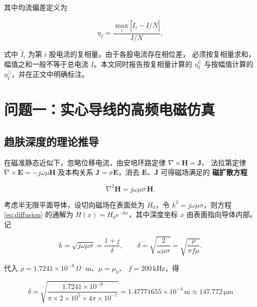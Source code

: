 \documentclass[12pt, a4paper]{ctexart}
\newcommand{\U}[1]{\ensuremath{\,\mathrm{#1}}}
\newcommand{\Uohmm}{\ensuremath{\,\Omega\cdot\mathrm{m}}}%
\begin{document}
其中均流偏差定义为

\begin{equation}
\eta_I = \frac{\max_i |\tilde I_i - I/N|}{I/N},
\label{eq:eta}
\end{equation}

式中 $\tilde I_i$ 为第 $i$ 股电流的复相量。由于各股电流存在相位差，
必须按复相量求和，幅值之和一般不等于总电流 $I$。本文同时报告按复相量计算的
$\eta_I^{\mathbb{C}}$ 与按幅值计算的 $\eta_I^{|\,|}$，并在正文中明确标注。

\section{问题一：实心导线的高频电磁仿真}

\subsection{趋肤深度的理论推导}

在磁准静态近似下，忽略位移电流，由安培环路定律 $\nabla\times\mathbf H = \mathbf J$、
法拉第定律 $\nabla\times\mathbf E = -j\omega\mu\mathbf H$ 及本构关系
$\mathbf J = \sigma\mathbf E$，消去 $\mathbf E$、$\mathbf J$ 可得磁场满足的
\textbf{磁扩散方程}

\begin{equation}
\nabla^2 \mathbf H = j\omega\mu\sigma\,\mathbf H .
\label{eq:diffusion}
\end{equation}

考虑半无限平面导体，设切向磁场在表面处为 $H_0$，令
$k^2 = j\omega\mu\sigma$，则方程 \eqref{eq:diffusion} 的通解为
$H(x) = H_0 e^{-kx}$，其中深度坐标 $x$ 由表面指向导体内部。
记

\begin{equation}
k = \sqrt{j\omega\mu\sigma} = \frac{1+j}{\delta},
\qquad
\delta = \sqrt{\frac{2}{\omega\mu\sigma}} = \sqrt{\frac{\rho}{\pi f \mu}} .
\end{equation}

代入 $\rho = 1.7241\times10^{-8}\Uohmm$、$\mu = \mu_0$、
$f = 200\U{kHz}$，得

\begin{equation}
\boxed{\ \delta = \sqrt{\frac{1.7241\times10^{-8}}{\pi \times 2\times10^{5} \times 4\pi\times10^{-7}}}
= 1.47771655\times10^{-4}\U{m} \approx 147.772\U{\mu m}\ }
\label{eq:delta-value}
\end{equation}
\end{document}
